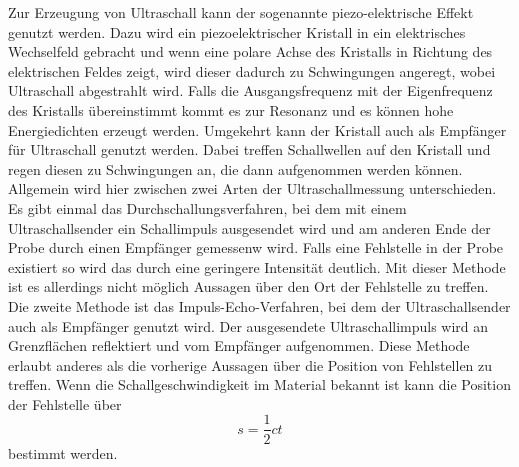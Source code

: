     Zur Erzeugung von Ultraschall kann der sogenannte piezo-elektrische Effekt 
    genutzt werden. Dazu wird ein piezoelektrischer Kristall in ein elektrisches 
    Wechselfeld gebracht und wenn eine polare Achse des Kristalls in Richtung 
    des elektrischen Feldes zeigt, wird dieser dadurch zu Schwingungen angeregt,
    wobei Ultraschall abgestrahlt wird. Falls die Ausgangsfrequenz mit der 
    Eigenfrequenz des Kristalls übereinstimmt kommt es zur Resonanz und es können
    hohe Energiedichten erzeugt werden. Umgekehrt kann der Kristall auch als 
    Empfänger für Ultraschall genutzt werden. Dabei treffen Schallwellen auf den 
    Kristall und regen diesen zu Schwingungen an, die dann aufgenommen werden 
    können. 
    Allgemein wird hier zwischen zwei Arten der Ultraschallmessung unterschieden.
    Es gibt einmal das Durchschallungsverfahren, bei dem mit einem 
    Ultraschallsender ein Schallimpuls ausgesendet wird und am anderen 
    Ende der Probe durch einen Empfänger gemessenw wird. Falls eine Fehlstelle
    in der Probe existiert so wird das durch eine geringere Intensität deutlich.
    Mit dieser Methode ist es allerdings nicht möglich Aussagen über 
    den Ort der Fehlstelle zu treffen.
    Die zweite Methode ist das Impuls-Echo-Verfahren, bei dem 
    der Ultraschallsender auch als Empfänger genutzt wird. 
    Der ausgesendete Ultraschallimpuls wird an Grenzflächen reflektiert
    und vom Empfänger aufgenommen. Diese Methode erlaubt anderes als die vorherige 
    Aussagen über die Position von Fehlstellen zu treffen.
    Wenn die Schallgeschwindigkeit im Material bekannt ist kann die Position der 
    Fehlstelle über 
    \begin{equation}
    \label{eqn:fehlstelle}
        s=\frac{1}{2} c t
    \end{equation}
    bestimmt werden.

